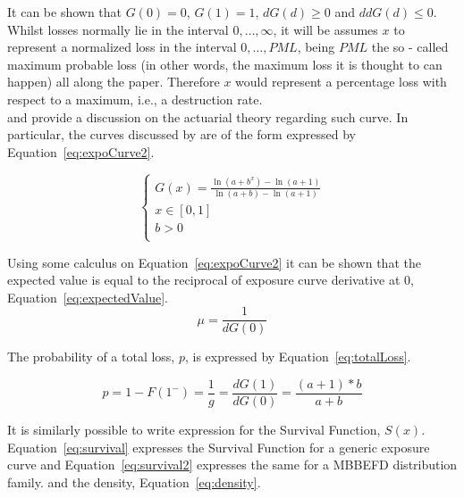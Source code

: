 \documentclass[nojss]{jss}
\begin{document}
It can be shown that $G \left( 0 \right)=0$, $G\left( 1 \right)=1$, $dG \left( d \right) \ge 0$ and $ddG \left( d \right) \le 0$. Whilst losses normally lie in the interval $0,\ldots, \infty$, it will be assumes $x$ to represent a normalized loss in the interval $0,\ldots, PML$, being $PML$ the so - called maximum probable loss (in other words, the maximum loss it is thought to can happen) all along the paper. Therefore $x$ would represent a percentage loss with respect to a maximum, i.e., a destruction rate.\\

\cite{bernegger1997tile} and \cite{mahler} provide a discussion on the actuarial theory regarding such curve. In particular, the curves discussed by \cite{bernegger1997tile} are of the form expressed by Equation~\ref{eq:expoCurve2}.

\begin{equation}
\left\{ \begin{array}{l}
G\left( x \right) = \frac{{\ln \left( {a + {b^x}} \right) - \ln \left( {a + 1} \right)}}{{\ln \left( {a + b} \right) - \ln \left( {a + 1} \right)}}\\
x \in \left[ {0,1} \right]\\
b > 0 \\
\end{array} \right.
\label{eq:expoCurve2}
\end{equation}

Using some calculus on Equation~\ref{eq:expoCurve2} it can be shown that the expected value is equal to the reciprocal of exposure curve derivative at 0, Equation~\ref{eq:expectedValue}.\\

\begin{equation}
  \mu = \frac{1}{dG \left( 0 \right) }
  \label{eq:expectedValue}
\end{equation}

The probability of a total loss, $p$, is expressed by Equation~\ref{eq:totalLoss}.

\begin{equation}
p = 1 - F\left( 1^{-}  \right) = \frac{1}{g} = \frac{dG\left( 1 \right)}{dG\left( 0 \right)} = \frac{\left( a + 1 \right)*b}{a + b}
\label{eq:totalLoss}
\end{equation}

It is similarly possible to write expression for the Survival Function, $S \left( x \right)$. Equation~\ref{eq:survival} expresses the Survival Function for a generic exposure curve and Equation~\ref{eq:survival2} expresses the same for a MBBEFD distribution family. and the density, Equation~\ref{eq:density}.
\end{document}
